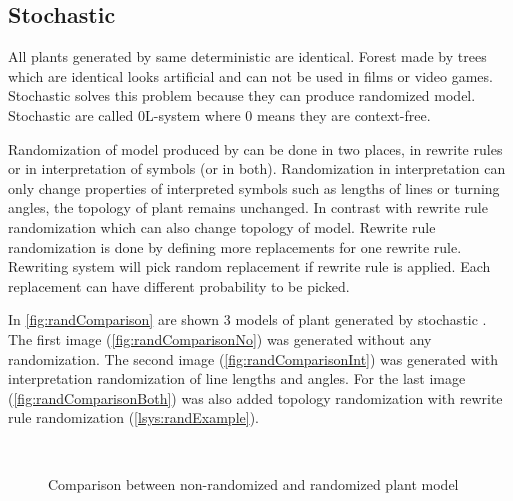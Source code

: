 \subsection{Stochastic \lsystems}

\newcommand{\zerolsystem}{\mbox{0L-system}\xspace}
\newcommand{\zerolsystems}{\mbox{0L-systems}\xspace}

All plants generated by same deterministic \lsystem are identical.
Forest made by trees which are identical looks artificial and can not be used in films or video games.
Stochastic \lsystems solves this problem because they can produce randomized model.
Stochastic \lsystems are called \zerolsystem where 0 means they are context-free.

Randomization of model produced by \lsystem can be done in two places, in rewrite rules or in interpretation of symbols (or in both).
Randomization in interpretation can only change properties of interpreted symbols such as lengths of lines or turning angles, the topology of plant remains unchanged.
In contrast with rewrite rule randomization which can also change topology of model.
Rewrite rule randomization is done by defining more replacements for one rewrite rule.
Rewriting system will pick random replacement if rewrite rule is applied.
Each replacement can have different probability to be picked.

In \autoref{fig:randComparison} are shown 3 models of plant generated by stochastic \lsystems.
The first image (\ref{fig:randComparisonNo}) was generated without any randomization.
The second image (\ref{fig:randComparisonInt}) was generated with interpretation randomization of line lengths and angles.
For the last image (\ref{fig:randComparisonBoth}) was also added topology randomization with rewrite rule randomization (\autoref{lsys:randExample}).

\begin{figure}[h]
	\centering
	 ~
	 ~
	\caption{Comparison between non-randomized and randomized plant model}
	\label{fig:randComparison}
\end{figure}

